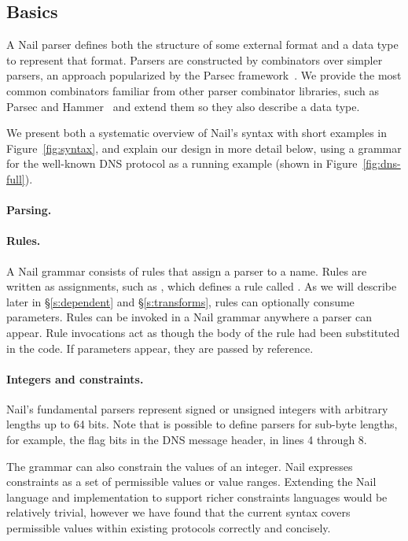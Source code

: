 

\subsection{Basics}

A Nail parser defines both the structure of some external format and a data type to represent that
format. Parsers are constructed by combinators over simpler parsers, an approach popularized by the Parsec
framework~\cite{LeijenMeijer:parsec}. We provide the most common combinators familiar from other parser
 combinator libraries, such as Parsec and Hammer~\cite{hammer-parser} and extend them so they also
 describe a data type. 

We present both a systematic overview of Nail's syntax with short examples
in Figure~\ref{fig:syntax}, and explain our design in more detail below,
using a grammar for the well-known DNS protocol as a running example
(shown in Figure~\ref{fig:dns-full}).


\paragraph{Parsing.}
\paragraph{Rules.}
A Nail grammar consists of rules that assign a parser to a name. Rules are written as assignments,
such as , which defines a rule called . As we will
describe later in \S\ref{s:dependent} and \S\ref{s:transforms}, rules can optionally consume parameters.
Rules can be invoked in a Nail grammar anywhere a parser can appear. Rule invocations act as though
the body of the rule had been substituted in the code. If parameters appear, they are passed by
reference.
\paragraph{Integers and constraints.}

Nail's fundamental parsers represent signed or unsigned
integers with arbitrary lengths up to 64 bits.
Note that is possible to define parsers for sub-byte lengths, for example, the flag bits in the DNS
message header, in lines 4 through 8.

The grammar can also constrain the values of an integer.  Nail expresses
constraints as a set of permissible values or value ranges. Extending the Nail language and
implementation to support richer constraints languages would be relatively trivial, however we have
found that the current syntax covers permissible values within existing protocols correctly and
concisely.


